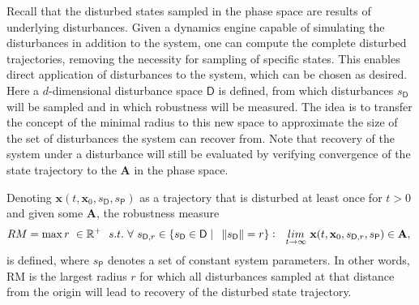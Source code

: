    Recall that the disturbed states sampled in the phase space are results of underlying disturbances. Given a dynamics engine capable of simulating the disturbances in addition to the system, one can compute the complete disturbed trajectories, removing the necessity for sampling of specific states. This enables direct application of disturbances to the system, which can be chosen as desired. Here a $d$-dimensional disturbance space $\mathsf{D}$ is defined, from which disturbances $s_{\mathsf{D}}$ will be sampled and in which robustness will be measured. The idea is to transfer the concept of the minimal radius to this new space to approximate the size of the set of disturbances the system can recover from. Note that recovery of the system under a disturbance will still be evaluated by verifying convergence of the state trajectory to the $\mathbf{A}$ in the phase space. 

    Denoting $\mathbf{x}(t,\mathbf{x}_0,s_{\mathsf{D}},s_{\mathsf{P}})$ as a trajectory that is disturbed at least once for $t > 0$ and given some $\mathbf{A}$, the robustness measure
    \begin{gather} \label{eq:8}
        RM = \max r\ \in \mathbb{R}^+ \ \ s.t.\ \forall\ s_{\mathsf{D},r} \in \{s_{\mathsf{D}} \in \mathsf{D} \mid\ \ \norm{s_{\mathsf{D}}} = r\}:\ \ \underset{t \rightarrow \infty}{lim} \ \mathbf{x}(t,\mathbf{x}_0,s_{\mathsf{D},r},s_{\mathsf{P}}) \in \mathbf{A},\
    \end{gather}
    is defined, where $s_{\mathsf{P}}$ denotes a set of constant system parameters.
    In other words, RM is the largest radius $r$ for which all disturbances sampled at that distance from the origin will lead to recovery of the disturbed state trajectory.

